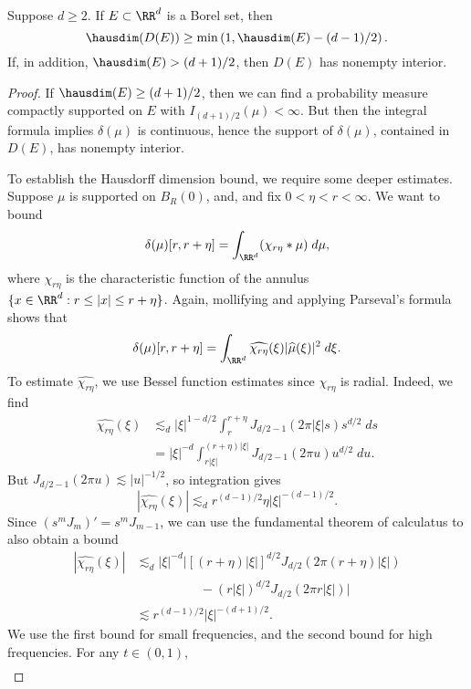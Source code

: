 \begin{theorem}
	Suppose $d \geq 2$. If $E \subset \RR^d$ is a Borel set, then
	\[ \hausdim(D(E)) \geq \min \left( 1, \hausdim(E) - (d - 1)/2 \right). \]
	If, in addition, $\hausdim(E) > (d+1)/2$, then $D(E)$ has nonempty interior.
\end{theorem}
\begin{proof}
	If $\hausdim(E) \geq (d+1)/2$, then we can find a probability measure compactly supported on $E$ with $I_{(d+1)/2}(\mu) < \infty$. But then the integral formula implies $\delta(\mu)$ is continuous, hence the support of $\delta(\mu)$, contained in $D(E)$, has nonempty interior.

	To establish the Hausdorff dimension bound, we require some deeper estimates. Suppose $\mu$ is supported on $B_R(0)$, and, and fix $0 < \eta < r < \infty$. We want to bound
	\[ \delta(\mu)[r,r+\eta] = \int_{\RR^d} (\chi_{r\eta} * \mu)\; d\mu, \]
	where $\chi_{r\eta}$ is the characteristic function of the annulus $\{ x \in \RR^d: r \leq |x| \leq r + \eta \}$. Again, mollifying and applying Parseval's formula shows that
	\[ \delta(\mu)[r,r+\eta] = \int_{\RR^d} \widehat{\chi_{r\eta}}(\xi) |\widehat{\mu}(\xi)|^2\; d\xi. \]
	To estimate $\widehat{\chi_{r\eta}}$, we use Bessel function estimates since $\chi_{r\eta}$ is radial. Indeed, we find
	\begin{align*}
		\widehat{\chi_{r\eta}}(\xi) &\lesssim_d |\xi|^{1-d/2} \int_r^{r + \eta} J_{d/2 - 1}(2 \pi |\xi| s) s^{d/2}\; ds\\
		&= |\xi|^{-d} \int_{r|\xi|}^{(r + \eta)|\xi|} J_{d/2 - 1}(2 \pi u) u^{d/2}\; du.
	\end{align*}
	But $J_{d/2 - 1}(2 \pi u) \lesssim |u|^{-1/2}$, so integration gives
	\[ |\widehat{\chi_{r\eta}}(\xi)| \lesssim_d r^{(d-1)/2} \eta |\xi|^{-(d-1)/2}. \]
	Since $(s^m J_m)' = s^m J_{m-1}$, we can use the fundamental theorem of calculatus to also obtain a bound
	\begin{align*}
		|\widehat{\chi_{r\eta}}(\xi)| &\lesssim_d |\xi|^{-d} \Big| \left[ (r + \eta)|\xi| \right]^{d/2} J_{d/2}(2 \pi (r + \eta) |\xi|)\\
		&\quad\quad\quad\quad\quad - (r |\xi|)^{d/2} J_{d/2}(2 \pi r |\xi|) \Big|\\
		&\lesssim r^{(d-1)/2} |\xi|^{-(d+1)/2}.
	\end{align*}
	We use the first bound for small frequencies, and the second bound for high frequencies. For any $t \in (0,1)$,
	\begin{align*}

\end{align*}
\end{proof}
